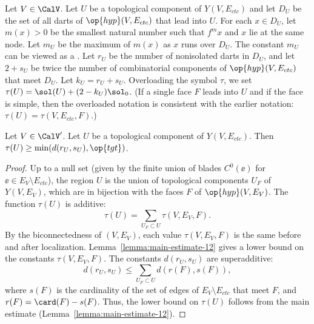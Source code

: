 \begin{definition}[$D_U$,~$m_U$,~$r_U$,~$s_U$,~$k_U$,~$\tau(U)$]
  Let $V\in \CalV$.  Let $U$ be a topological component of
  $Y(V,E_{ctc})$ and let $D_U$ be the set of all darts of $\op{hyp}(V,E_{ctc})$
 that lead into
  $U$.   For each
  $x\in D_U$, let $m(x) >0$ be the smallest natural number such that
  $f^{m} x$ and $x$ lie at the same node.  Let $m_U$ be the maximum of
  $m(x)$  as $x$ runs over $D_U$.  The constant $m_U$ can be viewed as
  a .  
Let $r_U$ be the number of nonisolated darts in $D_U$, and let $2+s_U$ be twice the
  number of combinatorial components of $\op{hyp}(V,E_{ctc})$ that
  meet $D_U$.  Let $k_U=r_U+s_U$.  Overloading the symbol $\tau$, we
  set $\tau(U) = \sol(U) +  (2-k_U)\sol_0$.   (If a single  face $F$ leads into
  $U$ and if the face is simple, then the overloaded notation is consistent
with the earlier notation: $\tau(U) = \tau(V,E_{ctc},F)$.)
%
\end{definition}

\begin{lemma}\label{lemma:tauU'}
  Let $V\in \CalV'$.
Let $U$ be a topological component of
  $Y(V,E_{ctc})$.   Then $\tau(U)\ge \min(d(r_U,s_U),\op{tgt})$.
\end{lemma}

\begin{proof}
Up to a null set (given by the finite union of blades $C^0(\ee)$ for
$\ee\in E_V\setminus E_{ctc}$), the region $U$ is the union of topological
components $U_F$ of $Y(V,E_V)$, which are in bijection with the faces
$F$ of $\op{hyp}(V,E_V)$.  The function $\tau(U)$ is additive:
\begin{equation}\label{eqn:tau-additive}
\tau(U) = \sum_{U_F\subset U} \tau(V,E_V,F).
\end{equation}
By the biconnectedness of $(V,E_V)$, each value $\tau(V,E_V,F)$ is the
same before and after localization.
Lemma~\ref{lemma:main-estimate-12} gives a lower bound on the
constants $\tau(V,E_V,F)$.  The constants $d(r_U,s_U)$ are superadditive:
\[
d(r_U,s_U) \le \sum_{U_F\subset U} d(r(F),s(F)),
\]
where $s(F)$ is the cardinality of the set of edges of $E_V\setminus
E_{ctc}$ that meet $F$, and $r(F) = \card(F)-s(F)$.  Thus, the 
lower bound on $\tau(U)$ follows from the main estimate
(Lemma~\ref{lemma:main-estimate-12}).
\end{proof}

